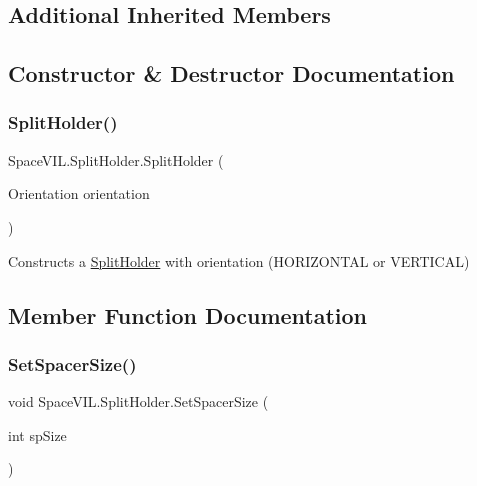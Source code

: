 \subsection*{Additional Inherited Members}


\subsection{Constructor \& Destructor Documentation}
\mbox{\label{class_space_v_i_l_1_1_split_holder_ae6b6eb9d5aaec2d342060ff43161c828}} 
\subsubsection{\texorpdfstring{Split\+Holder()}{SplitHolder()}}
{\footnotesize\ttfamily Space\+V\+I\+L.\+Split\+Holder.\+Split\+Holder (\begin{DoxyParamCaption}\item[{Orientation}]{orientation }\end{DoxyParamCaption})\hspace{0.3cm}{\ttfamily [inline]}}



Constructs a \mbox{\hyperlink{class_space_v_i_l_1_1_split_holder}{Split\+Holder}} with orientation (H\+O\+R\+I\+Z\+O\+N\+T\+AL or V\+E\+R\+T\+I\+C\+AL) 



\subsection{Member Function Documentation}
\mbox{\label{class_space_v_i_l_1_1_split_holder_a62cde28681c0be51120e07724db4486b}} 
\subsubsection{\texorpdfstring{Set\+Spacer\+Size()}{SetSpacerSize()}}
{\footnotesize\ttfamily void Space\+V\+I\+L.\+Split\+Holder.\+Set\+Spacer\+Size (\begin{DoxyParamCaption}\item[{int}]{sp\+Size }\end{DoxyParamCaption})\hspace{0.3cm}{\ttfamily [inline]}}



